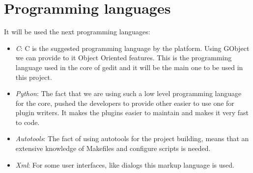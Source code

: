 \section{Programming languages}\label{sec:Programming languages}

It will be used the next programming languages:
\begin{itemize}
  \item \emph{C}: C is the suggested programming language by the platform. Using GObject we can provide to it Object Oriented features. This is the programming language used in the core of gedit and it will be the main one to be used in this project.
  \item \emph{Python}: The fact that we are using such a low level programming language for the core, pushed the developers to provide other easier to use one for plugin writers. It makes the plugins easier to maintain and makes it very fast to code.
  \item \emph{Autotools}: The fact of using autotools for the project building, means that an extensive knowledge of Makefiles and configure scripts is needed.
  \item \emph{Xml}: For some user interfaces, like dialogs this markup language is used.
\end{itemize}
